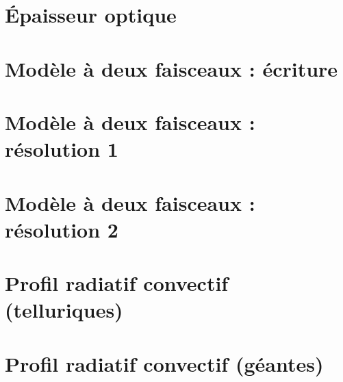 \documentclass[a4paper,DIV16,10pt]{scrartcl}
\begin{document}
\newpage
\section{\'Epaisseur optique}


\newpage
\section{Modèle à deux faisceaux : écriture}


\newpage
\section{Modèle à deux faisceaux : résolution 1}


\newpage
\section{Modèle à deux faisceaux : résolution 2}


%

\newpage
\section{Profil radiatif convectif (telluriques)}


\newpage
\section{Profil radiatif convectif (géantes)}


%
%
%
\end{document}
